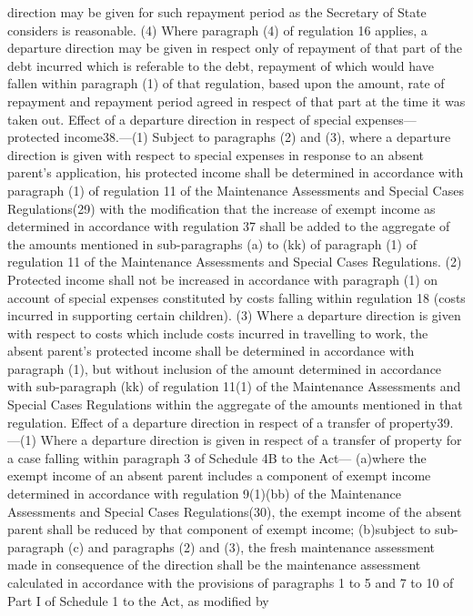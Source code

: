 \documentclass[a4paper]{article}
\begin{document}
direction may be given for such repayment period as the Secretary of State
considers is reasonable.
(4) Where paragraph (4) of regulation 16 applies, a departure direction may be
given in respect only of repayment of that part of the debt incurred which is
referable to the debt, repayment of which would have fallen within paragraph (1)
of that regulation, based upon the amount, rate of repayment and repayment
period agreed in respect of that part at the time it was taken out.
Effect of a departure direction in respect of special expenses—protected
income38.—(1) Subject to paragraphs (2) and (3), where a departure direction is
given with respect to special expenses in response to an absent parent’s
application, his protected income shall be determined in accordance with
paragraph (1) of regulation 11 of the Maintenance Assessments and Special Cases
Regulations(29) with the modification that the increase of exempt income as
determined in accordance with regulation 37 shall be added to the aggregate of
the amounts mentioned in sub-paragraphs (a) to (kk) of paragraph (1) of
regulation 11 of the Maintenance Assessments and Special Cases Regulations.
(2) Protected income shall not be increased in accordance with paragraph (1) on
account of special expenses constituted by costs falling within regulation 18
(costs incurred in supporting certain children).
(3) Where a departure direction is given with respect to costs which include
costs incurred in travelling to work, the absent parent’s protected income shall
be determined in accordance with paragraph (1), but without inclusion of the
amount determined in accordance with sub-paragraph (kk) of regulation 11(1) of
the Maintenance Assessments and Special Cases Regulations within the aggregate
of the amounts mentioned in that regulation.
Effect of a departure direction in respect of a transfer of property39.—(1)
Where a departure direction is given in respect of a transfer of property for a
case falling within paragraph 3 of Schedule 4B to the Act—
(a)where the exempt income of an absent parent includes a component of exempt
income determined in accordance with regulation 9(1)(bb) of the Maintenance
Assessments and Special Cases Regulations(30), the exempt income of the absent
parent shall be reduced by that component of exempt income;
(b)subject to sub-paragraph (c) and paragraphs (2) and (3), the fresh
maintenance assessment made in consequence of the direction shall be the
maintenance assessment calculated in accordance with the provisions of
paragraphs 1 to 5 and 7 to 10 of Part I of Schedule 1 to the Act, as modified by
\end{document}
